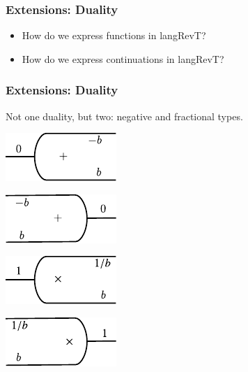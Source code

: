 \documentclass[svgnames,11pt]{beamer}
\begin{document}
\begin{frame}
\frametitle{Extensions: Duality}

\begin{itemize}
\vfill
\item How do we express functions in {{langRevT}}?

\vfill
\item How do we express continuations in {{langRevT}}?

\vfill
\end{itemize}


\end{frame}


\begin{frame}
\frametitle{Extensions: Duality}

Not one duality, but two: negative and fractional types. 


%

\begin{multicols}{2}
\begin{center}
  \includegraphics{diagrams/eta.pdf}
\end{center}
  
\begin{center}
 \includegraphics{diagrams/eps.pdf}
\end{center}
\end{multicols}
\begin{multicols}{2}
\begin{center}
  \includegraphics{diagrams/eta_times.pdf}
\end{center}
  
\begin{center}
  \includegraphics{diagrams/eps_times.pdf}
\end{center}
\end{multicols}


\end{frame}
\end{document}
